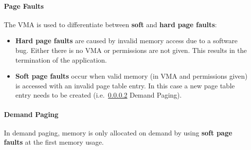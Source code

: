 
\paragraph{Page Faults}
The VMA is used to differentiate between \textbf{soft} and \textbf{hard page faults}:
\begin{itemize}
    \item \textbf{Hard page faults} are caused by invalid memory access due to a software bug. Either there is no VMA or permissions are not given. This results in the termination of the application.
    \item \textbf{Soft page faults} occur when valid memory (in VMA and permissions given) is accessed with an invalid page table entry. In this case a new page table entry needs to be created (i.e.~\ref{page demanding} Demand Paging).
\end{itemize}



\paragraph{Demand Paging}\label{page demanding}
In demand paging, memory is only allocated on demand by using \textbf{soft page faults} at the first memory usage.

\newpar{}

